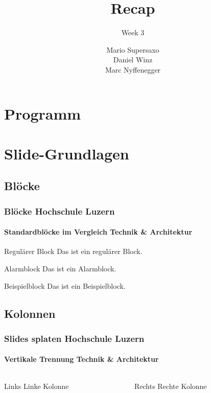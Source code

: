 \documentclass{beamer}
\title{Recap}
\subtitle{Week 3}
\author{Mario Supersaxo \\ Daniel Winz \\ Marc Nyffenegger}
\begin{document}
\maketitle


\section*{Programm}
\begin{frame}
\tableofcontents
\end{frame}

\section{Slide-Grundlagen}

\subsection{Blöcke}

\begin{frame}
	\frametitle{Blöcke \hfill \footnotesize{Hochschule Luzern}}
	\framesubtitle{Standardblöcke im Vergleich \hfill \tiny{Technik \& Architektur}}
	
	\begin{block}{Regulärer Block}
		Das ist ein regulärer Block.
	\end{block}

	\begin{alertblock}{Alarmblock}
		Das ist ein Alarmblock.
	\end{alertblock}

	\begin{exampleblock}{Beispielblock}
		Das ist ein Beispielblock.
	\end{exampleblock}
\end{frame}

\subsection{Kolonnen}

\begin{frame}
	\frametitle{Slides splaten \hfill \footnotesize{Hochschule Luzern}}
	\framesubtitle{Vertikale Trennung \hfill \tiny{Technik \& Architektur}}

	\begin{columns}
		\begin{column}{5cm}
			\begin{block}{Links}
				Linke Kolonne
			\end{block}
		\end{column}
		\begin{column}{5cm}
			\begin{block}{Rechts}
				Rechte Kolonne
			\end{block}
		\end{column}
	\end{columns}
\end{frame}





\end{document}
